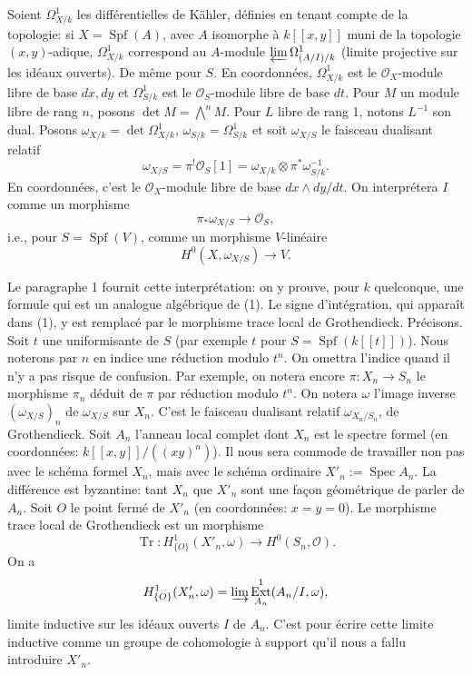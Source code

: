 \documentclass[11pt]{article}
\DeclareMathOperator{\Spec}{Spec}
\DeclareMathOperator{\Spf}{Spf}
\DeclareMathOperator{\Ext}{Ext}
\DeclareMathOperator{\Tr}{Tr}
\newcommand{\OO}{\mathcal O}
\begin{document}
Soient $\Omega^1_{X/k}$ les différentielles de Kähler, définies en tenant compte de la topologie: si $X=\Spf(A)$, avec $A$ isomorphe à $k[[x,y]]$ muni de la topologie $(x,y)$-adique, $\Omega^1_{X/k}$ correspond au $A$-module $\varprojlim\Omega^1_{(A/I)/k}$ (limite projective sur les idéaux ouverts). De même pour $S$. En coordonnées, $\Omega^1_{X/k}$ est le $\OO_X$-module libre de base $dx,dy$ et $\Omega^1_{S/k}$ est le $\OO_S$-module libre de base $dt$. Pour $M$ un module libre de rang $n$, posons $\det M=\bigwedge^nM$. Pour $L$ libre de rang 1, notons $L^{-1}$ son dual. Posons $\omega_{X/k}=\det\Omega^1_{X/k}$, $\omega_{S/k}=\Omega^1_{S/k}$ et soit $\omega_{X/S}$ le faisceau dualisant relatif
\[
        \omega_{X/S}=\pi^!\OO_S[1]=\omega_{X/k}\otimes\pi^*\omega_{S/k}^{-1}.
\]
En coordonnées, c'est le $\OO_X$-module libre de base $dx\wedge dy/dt$. On interprétera $I$ comme un morphisme
\[
        \pi_*\omega_{X/S}\longrightarrow\OO_S,
\]
i.e., pour $S=\Spf(V)$, comme un morphisme $V$-linéaire
\[
        H^0(X,\omega_{X/S})\longrightarrow V.
\]

Le paragraphe 1 fournit cette interprétation: on y prouve, pour $k$ quelconque, une formule qui est un analogue algébrique de (1). Le signe d'intégration, qui apparaît dans (1), y est remplacé par le morphisme trace local de Grothendieck. Précisons. Soit $t$ une uniformisante de $S$ (par exemple $t$ pour $S=\Spf(k[[t]])$). Nous noterons par $n$ en indice une réduction modulo $t^n$. On omettra l'indice quand il n'y a pas risque de confusion. Par exemple, on notera encore $\pi:X_n\to S_n$ le morphisme $\pi_n$ déduit de $\pi$ par réduction modulo $t^n$. On notera $\omega$ l'image inverse $(\omega_{X/S})_n$ de $\omega_{X/S}$ sur $X_n$. C'est le faisceau dualisant relatif $\omega_{X_n/S_n}$, de Grothendieck. Soit $A_n$ l'anneau local complet dont $X_n$ est le spectre formel (en coordonnées: $k[[x,y]]/((xy)^n)$). Il nous sera commode de travailler non pas avec le schéma formel $X_n$, mais avec le schéma ordinaire $X'_n:=\Spec A_n$. La différence est byzantine: tant $X_n$ que $X'_n$ sont une façon géométrique de parler de $A_n$. Soit $O$ le point fermé de $X'_n$ (en coordonnées: $x=y=0$). Le morphisme trace local de Grothendieck est un morphisme
\[
        \Tr:H^1_{\{O\}}(X'_n,\omega)\longrightarrow H^0(S_n,\OO).
\]
On a
\[
        H^1_{\{O\}}(X'_n,\omega)=\varinjlim \Ext^1_{A_n}(A_n/I,\omega),
\]
limite inductive sur les idéaux ouverts $I$ de $A_n$. C'est pour écrire cette limite inductive comme un groupe de cohomologie à support qu'il nous a fallu introduire $X'_n$.
\end{document}
